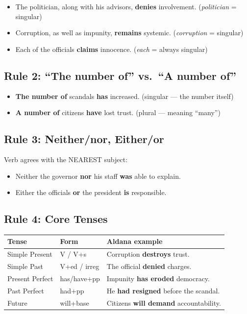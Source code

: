 \documentclass[10pt,a4paper]{article}
\begin{document}
\begin{itemize}[nosep]
\item The politician, along with his advisors, \textbf{denies}
      involvement. (\emph{politician} = singular)
\item Corruption, as well as impunity, \textbf{remains} systemic.
      (\emph{corruption} = singular)
\item Each of the officials \textbf{claims} innocence.
      (\emph{each} = always singular)
\end{itemize}

\subsection*{Rule 2: ``The number of'' vs.\ ``A number of''}

\begin{itemize}[nosep]
\item \textbf{The number of} scandals \textbf{has} increased.
      (singular --- the number itself)
\item \textbf{A number of} citizens \textbf{have} lost trust.
      (plural --- meaning ``many'')
\end{itemize}

\subsection*{Rule 3: Neither/nor, Either/or}

Verb agrees with the NEAREST subject:
\begin{itemize}[nosep]
\item Neither the governor \textbf{nor} his staff
      \textbf{was} able to explain.
\item Either the officials \textbf{or} the president
      \textbf{is} responsible.
\end{itemize}

\subsection*{Rule 4: Core Tenses}

\begin{center}
\begin{tabular}{lll}
\toprule
\textbf{Tense} & \textbf{Form} & \textbf{Aldana example} \\
\midrule
Simple Present & V / V+s & Corruption \textbf{destroys} trust. \\
Simple Past & V+ed / irreg & The official \textbf{denied} charges. \\
Present Perfect & has/have+pp & Impunity \textbf{has eroded} democracy. \\
Past Perfect & had+pp & He \textbf{had resigned} before the scandal. \\
Future & will+base & Citizens \textbf{will demand} accountability. \\
\bottomrule
\end{tabular}
\end{center}
\end{document}
